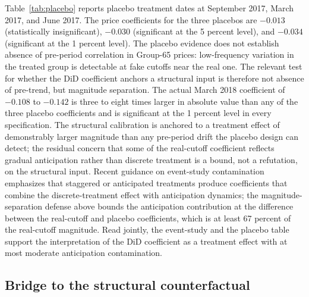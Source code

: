 

Table~\ref{tab:placebo} reports placebo treatment dates at September 2017, March 2017, and June 2017. The price coefficients for the three placebos are $-0.013$ (statistically insignificant), $-0.030$ (significant at the 5 percent level), and $-0.034$ (significant at the 1 percent level). The placebo evidence does not establish absence of pre-period correlation in Group-65 prices: low-frequency variation in the treated group is detectable at fake cutoffs near the real one. The relevant test for whether the DiD coefficient anchors a structural input is therefore not absence of pre-trend, but magnitude separation. The actual March 2018 coefficient of $-0.108$ to $-0.142$ is three to eight times larger in absolute value than any of the three placebo coefficients and is significant at the 1 percent level in every specification. The structural calibration is anchored to a treatment effect of demonstrably larger magnitude than any pre-period drift the placebo design can detect; the residual concern that some of the real-cutoff coefficient reflects gradual anticipation rather than discrete treatment is a bound, not a refutation, on the structural input. Recent guidance on event-study contamination \citep{borusyak2024, sun2021} emphasizes that staggered or anticipated treatments produce coefficients that combine the discrete-treatment effect with anticipation dynamics; the magnitude-separation defense above bounds the anticipation contribution at the difference between the real-cutoff and placebo coefficients, which is at least 67 percent of the real-cutoff magnitude. Read jointly, the event-study and the placebo table support the interpretation of the DiD coefficient as a treatment effect with at most moderate anticipation contamination.

\subsection{Bridge to the structural counterfactual}

